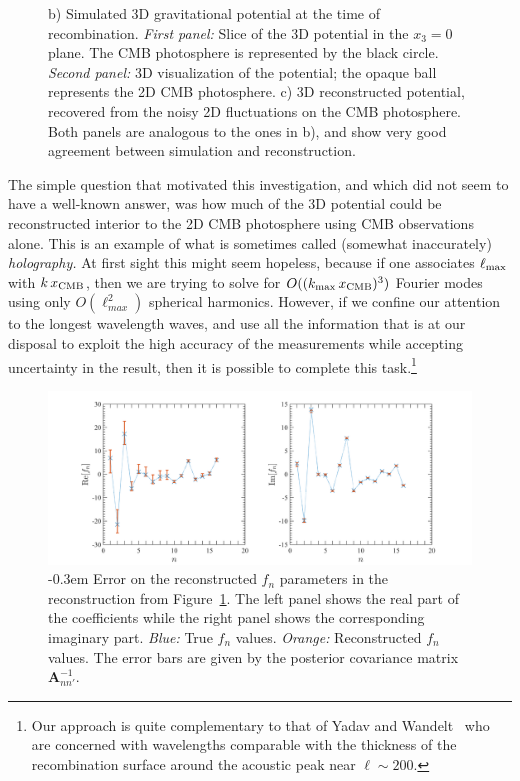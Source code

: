 \documentclass[psfig,12pt]{article}
\def\ni{\noindent}
\begin{document}
{\begin{figure}[t]
{{  b) Simulated 3D gravitational potential at the time
of recombination.  {\it First panel: } Slice of the 3D potential in the
$x_3=0$ plane. The CMB photosphere is represented by the black circle.  {\it Second panel: } 3D visualization of the potential; the opaque ball represents the 2D CMB photosphere. c) 3D reconstructed potential, recovered from the noisy 2D fluctuations on the CMB photosphere. Both panels are analogous to the ones in b), and show very good agreement between simulation and reconstruction.
}}
\label{Fig:Mockreconstruction}
\end{figure}


\ni{\bf Preliminary Results:}
The simple question that motivated this investigation, and which did not
seem to have a well-known answer, was how much of the 3D potential could
be reconstructed interior to the 2D CMB photosphere using CMB
observations alone. This is an example of what is sometimes called (somewhat inaccurately) {\it
holography.} At first sight this might seem hopeless, because if one
associates $\ell_{\rm max}$ with $k\,x_{\rm CMB}$, then we are trying to
solve for $O((k_{\rm max}\,x_{\rm CMB})^3)$ Fourier modes using only
$O(\ell_{max}^2)$ spherical harmonics. However, if we confine our
attention to the longest wavelength waves, and
use all the information that is at our disposal to exploit the high
accuracy of the measurements while accepting uncertainty in the result,
then it is possible to complete this task.\footnote{Our approach is
quite complementary to that of Yadav and Wandelt~\cite{Yadav:2005} who
are concerned with wavelengths comparable with the thickness of the
recombination surface around the acoustic peak near $\ell\sim200$.}


\begin{figure}[t]
\vspace{-1cm}
\centering\includegraphics[width=0.8\linewidth]{figures/errorrec.pdf}
\caption{
\openup -0.3em
{\footnotesize
Error on the reconstructed $f_n$ parameters in the reconstruction from Figure~\ref{Fig:Mockreconstruction}. The left panel shows the real part of the coefficients while the right panel shows the corresponding imaginary part.
 {\it Blue:} True $f_n$ values. {\it Orange: } Reconstructed $f_n$ values. The error bars are given by the  posterior covariance matrix $\mathbf{A}_{nn'}^{-1}$.
}}
\label{Fig:recerror}
\end{figure}


}
\end{document}
